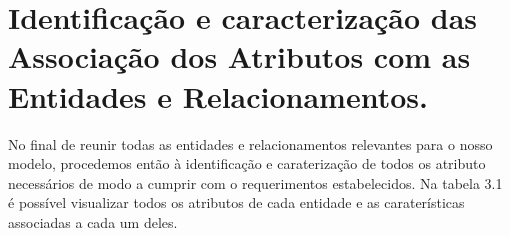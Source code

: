 \section{Identificação e caracterização das Associação dos Atributos
com as Entidades e Relacionamentos.}

No final de reunir todas as entidades e relacionamentos relevantes para o nosso modelo, procedemos então à identificação e caraterização de todos os atributo necessários de modo a cumprir com o requerimentos estabelecidos. Na  tabela 3.1 é possível visualizar todos os atributos de cada entidade e as caraterísticas associadas a cada um deles.

\vspace{10 pt}

\begin{table}[h]
\end{table}
